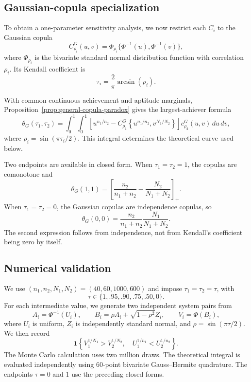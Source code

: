 \documentclass[12pt]{article}
\begin{document}

\subsection{Gaussian-copula specialization}

To obtain a one-parameter sensitivity analysis, we now restrict each
\(C_i\) to the Gaussian copula
\[
C_{\rho_i}^{G}(u,v)
=
\Phi_{\rho_i}\{\Phi^{-1}(u),\Phi^{-1}(v)\},
\]
where \(\Phi_{\rho_i}\) is the bivariate standard normal distribution
function with correlation \(\rho_i\).  Its Kendall coefficient is
\[
\tau_i=\frac{2}{\pi}\arcsin(\rho_i).
\]

With common continuous achievement and aptitude marginals,
Proposition~\ref{prop:general-copula-paradox} gives the largest-achiever formula
\[
\theta_G(\tau_1,\tau_2)
=
\int_0^1\int_0^1
\left[
u^{n_1/n_2}
-C_{\rho_1}^{G}
\left\{u^{n_1/n_2},v^{N_1/N_2}\right\}
\right]
c_{\rho_2}^{G}(u,v)\,du\,dv,
\]
where \(\rho_i=\sin(\pi\tau_i/2)\).  This integral determines the
theoretical curve used below.

Two endpoints are available in closed form.  When \(\tau_1=\tau_2=1\), the
copulas are comonotone and
\[
\theta_G(1,1)
=
\left[
\frac{n_2}{n_1+n_2}-\frac{N_2}{N_1+N_2}
\right]_+.
\]
When \(\tau_1=\tau_2=0\), the Gaussian copulas are independence copulas, so
\[
\theta_G(0,0)
=
\frac{n_2}{n_1+n_2}\frac{N_1}{N_1+N_2}.
\]
The second expression follows from independence, not from Kendall's coefficient
being zero by itself.

\subsection{Numerical validation}

We use \((n_1,n_2,N_1,N_2)=(40,60,1000,600)\) and impose
\(\tau_1=\tau_2=\tau\), with
\[
\tau\in\{1,.95,.90,.75,.50,0\}.
\]
For each intermediate value, we generate two independent system pairs from
\[
A_i=\Phi^{-1}(U_i),
\qquad
B_i=\rho A_i+\sqrt{1-\rho^2}Z_i,
\qquad
V_i=\Phi(B_i),
\]
where \(U_i\) is uniform, \(Z_i\) is independently standard normal, and
\(\rho=\sin(\pi\tau/2)\).  We then record
\[
\mathbf 1\left\{
V_1^{1/N_1}>V_2^{1/N_2},\quad
U_1^{1/n_1}<U_2^{1/n_2}
\right\}.
\]
The Monte Carlo calculation uses two million draws.  The theoretical integral
is evaluated independently using 60-point bivariate Gauss--Hermite quadrature.
The endpoints \(\tau=0\) and \(1\) use the preceding closed forms.
\end{document}
